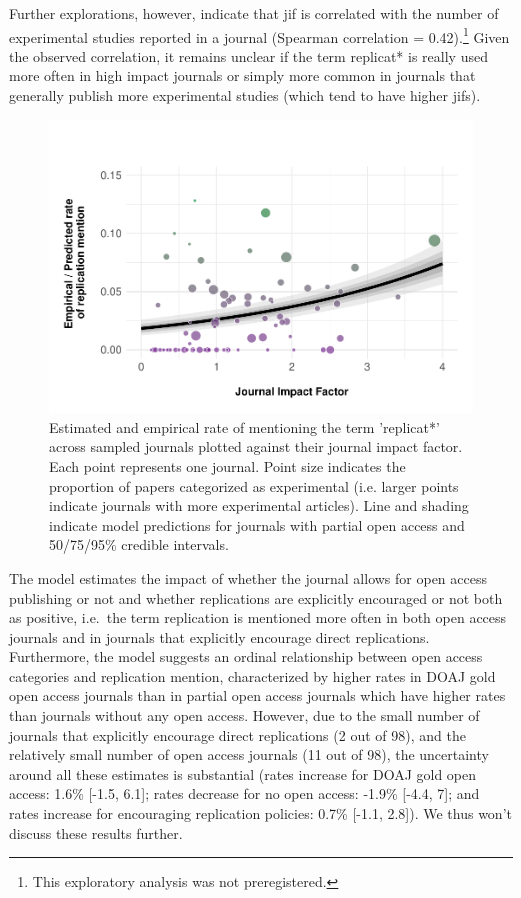 \documentclass[cm,linguex]{glossa}
\begin{document}
Further explorations, however, indicate that jif is correlated with the number of experimental studies reported in a journal (Spearman correlation = 0.42).\footnote{This exploratory analysis was not preregistered.}
Given the observed correlation, it remains unclear if the term replicat* is really used more often in high impact journals or simply more common in journals that generally publish more experimental studies (which tend to have higher jifs).

\begin{figure}

{\centering \includegraphics[width=1\linewidth]{ReplicationLing_files/figure-latex/plot-mention-jif-1} 

}

\caption{Estimated and empirical rate of mentioning the term 'replicat*' across sampled journals plotted against their journal impact factor. Each point represents one journal. Point size indicates the proportion of papers categorized as experimental (i.e. larger points indicate journals with more experimental articles). Line and shading indicate model predictions for journals with partial open access and 50/75/95\% credible intervals.}\label{fig:plot-mention-jif}
\end{figure}

The model estimates the impact of whether the journal allows for open access publishing or not and whether replications are explicitly encouraged or not both as positive, i.e.~the term replication is mentioned more often in both open access journals and in journals that explicitly encourage direct replications. Furthermore, the model suggests an ordinal relationship between open access categories and replication mention, characterized by higher rates in DOAJ gold open access journals than in partial open access journals which have higher rates than journals without any open access. However, due to the small number of journals that explicitly encourage direct replications (2 out of 98), and the relatively small number of open access journals (11 out of 98), the uncertainty around all these estimates is substantial (rates increase for DOAJ gold open access: 1.6\% {[}-1.5, 6.1{]}; rates decrease for no open access: -1.9\% {[}-4.4, 7{]}; and rates increase for encouraging replication policies: 0.7\% {[}-1.1, 2.8{]}). We thus won't discuss these results further.
\end{document}
